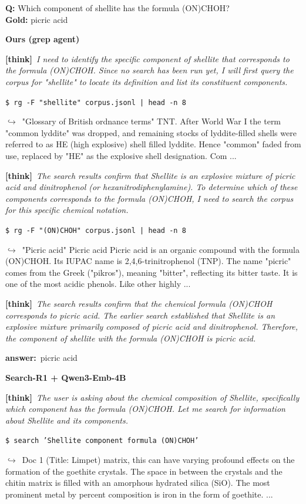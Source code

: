 \documentclass{llmxive}
\providecommand{\cmark}{\ding{51}}
\providecommand{\xmark}{\ding{55}}
\providecommand{\winbadge}{\colorbox{green!50!black}{\scriptsize\bfseries\,WIN\,}}
\providecommand{\thk}[1]{{\footnotesize\textbf{[think]}\ \textit{#1}\par}}
\providecommand{\cmd}[1]{{\footnotesize\texttt{\$\ #1}\par}}
\providecommand{\retr}[1]{{\footnotesize\quad$\hookrightarrow$\ #1\par}}
\providecommand{\ans}[1]{{\footnotesize\textbf{answer:}\ #1\par}}
\begin{document}
\begin{cmpbox}[label={ex:hotpot-formula},title={\winbadge\ \ \textsc{HotpotQA -- symbolic / rare-token match}}]
\textbf{Q:} Which component of shellite has the formula (ON)CHOH?\\[1pt]
\textbf{Gold:} picric acid\par\smallskip
\textbf{Ours (grep agent)}~\cmark\par
  \thk{I need to identify the specific component of shellite that corresponds to the formula (ON)CHOH. Since no search has been run yet, I will first query the corpus for "shellite" to locate its definition and list its constituent components.}
  \cmd{rg -F "shellite" corpus.jsonl | head -n 8}
  \retr{"Glossary of British ordnance terms" TNT. After World War I the term "common lyddite" was dropped, and remaining stocks of lyddite-filled shells were referred to as HE (high explosive) shell filled lyddite. Hence "common" faded from use, replaced by "HE" as the explosive shell designation. Com ...}
  \thk{The search results confirm that Shellite is an explosive mixture of picric acid and dinitrophenol (or hexanitrodiphenylamine). To determine which of these components corresponds to the formula (ON)CHOH, I need to search the corpus for this specific chemical notation.}
  \cmd{rg -F "(ON)CHOH" corpus.jsonl | head -n 8}
  \retr{"Picric acid" Picric acid Picric acid is an organic compound with the formula (ON)CHOH. Its IUPAC name is 2,4,6-trinitrophenol (TNP). The name "picric" comes from the Greek ("pikros"), meaning "bitter", reflecting its bitter taste. It is one of the most acidic phenols. Like other highly ...}
  \thk{The search results confirm that the chemical formula (ON)CHOH corresponds to picric acid. The earlier search established that Shellite is an explosive mixture primarily composed of picric acid and dinitrophenol. Therefore, the component of shellite with the formula (ON)CHOH is picric acid.}
  \ans{picric acid}
\smallskip\par\textbf{Search-R1 + Qwen3-Emb-4B}~\xmark\par
  \thk{The user is asking about the chemical composition of Shellite, specifically which component has the formula (ON)CHOH. Let me search for information about Shellite and its components.}
  \cmd{search 'Shellite component formula (ON)CHOH'}
  \retr{Doc 1 (Title: Limpet) matrix, this can have varying profound effects on the formation of the goethite crystals. The space in between the crystals and the chitin matrix is filled with an amorphous hydrated silica (SiO). The most prominent metal by percent composition is iron in the form of goethite. ...}

\end{cmpbox}
\end{document}
